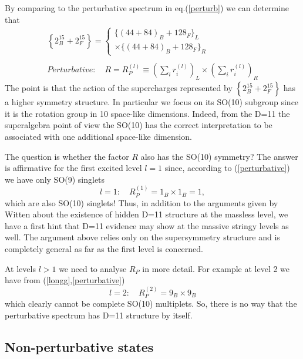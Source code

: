 By comparing to the perturbative spectrum in eq.(\ref{perturb}) we can
determine that
\begin{equation}
\begin{array}{c}
\left\{ 2_B^{15}+2_F^{15}\right\} =\left\{
\begin{array}{l}
\{\left( 44+84\right) _B+128_F\}_L \\
\times \{\left( 44+84\right) _B+128_F\}_R
\end{array}
\right. \\
\\
{Perturbative: \quad }R=R_P^{(l)}\equiv \left( \sum_ir_i^{(l)}\right)
_L\times \left( \sum_ir_i^{(l)}\right) _R
\end{array}
\label{longg}
\end{equation}
The point is that the action of the supercharges represented by $\left\{
2_B^{15}+2_F^{15}\right\} $ has a higher symmetry structure. In particular
we focus on its SO(10) subgroup since it is the rotation group in 10
space-like dimensions. Indeed, from the D=11 the superalgebra point of view
the SO(10) has the correct interpretation to be associated with one
additional space-like dimension.

The question is whether the factor $R$ also has the SO(10) symmetry? The
answer is affirmative \cite{ibmembrane} for the first excited level $l=1$
since, according to (\ref{perturbative}) we have only SO(9) singlets
\[
l=1:\quad R_P^{(1)}=1_B\times 1_B=1,
\]
which are also SO(10) singlets! Thus, in addition to the arguments given by
Witten about the existence of hidden D=11 structure at the massless level,
we have a first hint that D=11 evidence may show at the massive stringy
levels as well. The argument above relies only on the supersymmetry
structure and is completely general as far as the first level is concerned.

At levels $l>1$ we need to analyse $R_P$ in more detail. For example at
level 2 we have from (\ref{longg},\ref{perturbative})
\begin{equation}
l=2:\quad R_P^{(2)}=9_B\times 9_B  \label{incomplete}
\end{equation}
which clearly cannot be complete SO(10) multiplets. So, there is no way that
the perturbative spectrum has D=11 structure by itself.

\subsection{Non-perturbative states}

